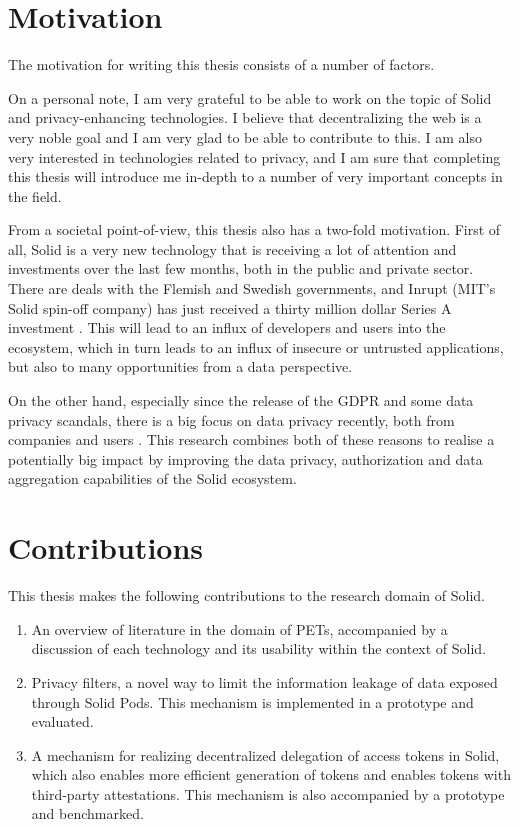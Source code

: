 \section{Motivation}
\label{sec:motivation}
The motivation for writing this thesis consists of a number of factors. 

On a personal note, I am very grateful to be able to work on the topic of Solid and privacy-enhancing technologies. I believe that decentralizing the web is a very noble goal and I am very glad to be able to contribute to this. I am also very interested in technologies related to privacy, and I am sure that completing this thesis will introduce me in-depth to a number of very important concepts in the field.

From a societal point-of-view, this thesis also has a two-fold motivation. First of all, Solid is a very new technology that is receiving a lot of attention and investments over the last few months, both in the public and private sector. There are deals with the Flemish  and Swedish  governments, and Inrupt (MIT's Solid spin-off company) has just received a thirty million dollar Series A investment . This will lead to an influx of developers and users into the ecosystem, which in turn leads to an influx of insecure or untrusted applications, but also to many opportunities from a data perspective. 

On the other hand, especially since the release of the GDPR and some data privacy scandals, there is a big focus on data privacy recently, both from companies and users . This research combines both of these reasons to realise a potentially big impact by improving the data privacy, authorization and data aggregation capabilities of the Solid ecosystem. 

\section{Contributions}
\label{sec:contributions}
This thesis makes the following contributions to the research domain of Solid.
\begin{enumerate}
    \item An overview of literature in the domain of \acrlong{PETs}, accompanied by a discussion of each technology and its usability within the context of Solid.
    \item Privacy filters, a novel way to limit the information leakage of data exposed through Solid Pods. This mechanism is implemented in a prototype and evaluated.
    \item A mechanism for realizing decentralized delegation of access tokens in Solid, which also enables more efficient generation of tokens and enables tokens with third-party attestations. This mechanism is also accompanied by a prototype and benchmarked.
\end{enumerate}

